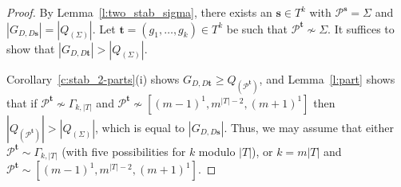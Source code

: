 \documentclass[10pt,a4paper]{amsart}
\newcommand{\geqs}{\geqslant}
\newcommand{\minPart}{\Gamma_{k, |T|}}
\begin{document}
\begin{proof}
	By Lemma~\ref{l:two_stab_sigma},  there exists an $\mathbf{s}\in T^k$ with $\mathcal{P}^{\mathbf{s}} = \Sigma$ and $|G_{D,D\mathbf{s}}|  =  |Q_{(\Sigma)}|$. Let $\mathbf{t} = (g_1,\dots,g_k) \in T^k$ be such that $\mathcal{P}^{\mathbf{t}} \not \sim\Sigma$. It suffices to  show that $|G_{D,D\mathbf{t}}| > |Q_{(\Sigma)}|$.

    Corollary~\ref{c:stab_2-parts}(i) shows $G_{D,D\mathbf{t}} \geqs Q_{(\mathcal{P}^{\mathbf{t}})}$, and Lemma~\ref{l:part}  shows that if $\mathcal{P}^{\mathbf{t}}\not \sim \minPart$ and $\mathcal{P}^{\mathbf{t}} \not \sim [(m-1)^1, m^{|T|-2}, (m+1)^{1}]$ then 
	$|Q_{(\mathcal{P}^{\mathbf{t}})}| > |Q_{(\Sigma)}|$, which is equal to $|G_{D,D\mathbf{s}}|$.
	Thus, we may assume that either $\mathcal{P}^{\mathbf{t}}\sim \minPart$ (with five possibilities for $k$ modulo $|T|$), or $k = m|T|$ and $\mathcal{P}^{\mathbf{t}} \sim [(m-1)^1, m^{|T|-2}, (m+1)^{1}]$.
	

\end{proof}
\end{document}
